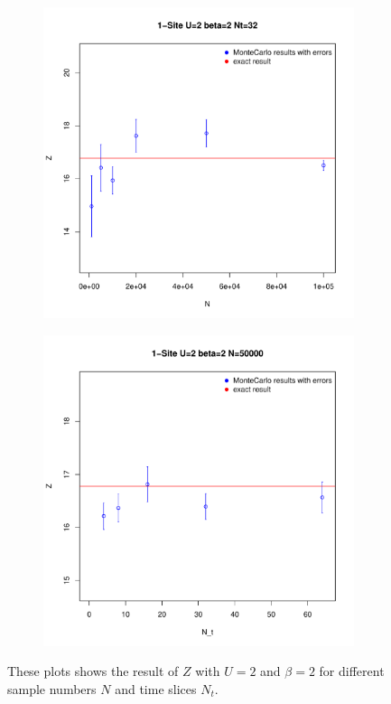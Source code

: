 \begin{figure}[H]
\begin{subfigure}[c]{0.5\textwidth}
		\includegraphics[width=1\textwidth]{figs/plot_Z1N}
		\label{fig:plotz1n}
	\end{subfigure}
	\begin{subfigure}[c]{0.5\textwidth}
		\includegraphics[width=1\textwidth]{figs/plot_Z1Nt}
		\label{fig:plotz1nt}
	\end{subfigure}
	\caption{These plots shows the result of $Z$ with $U=2$ and $\beta=2$ for different sample numbers $N$ and time slices $N_t$.}
	\label{fig:N}
\end{figure}

